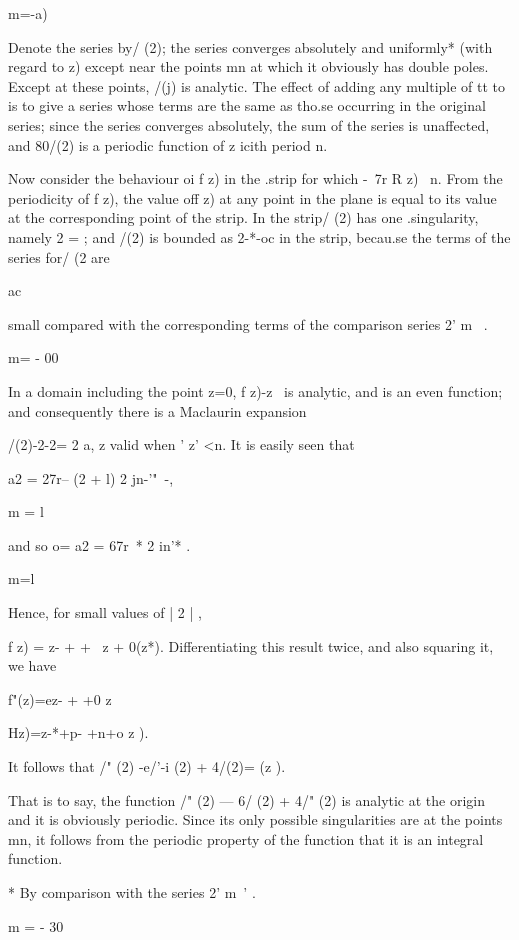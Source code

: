 {m=-a) 

Denote the series by/ (2); the series converges absolutely and uniformly* (with regard 
to z) except near the points mn at which it obviously has double poles. Except at these 
points, /(j) is analytic. The effect of adding any multiple of tt to   is to give a series 
whose terms are the same as tho.se occurring in the original series; since the series 
converges absolutely, the sum of the series is unaffected, and 80/(2) is a periodic function 
of z icith period n. 

Now consider the behaviour oi f z) in the .strip for which -\ 7r  R z) \ n. From 
the periodicity of f z), the value off z) at any point in the plane is equal to its value at 
the corresponding point of the strip. In the strip/ (2) has one .singularity, namely 2 = ; 
and /(2) is bounded as 2-*-oc in the strip, becau.se the terms of the series for/ (2 are 

ac 

small compared with the corresponding terms of the comparison series 2' m~ . 

m= - 00 

In a domain including the point z=0, f z)-z~  is analytic, and is an even function; 
and consequently there is a Maclaurin expansion 

/(2)-2-2= 2 a, z  
valid when ' z' <n. It is easily seen that 

a2  = 27r-- (2  + l) 2 jn-'"~-, 

m = l 

and so  o=   a2 = 67r~* 2 in'* . 

m=l 

Hence, for small values of | 2 | , 

f z) = z-  +   +  \ z  + 0(z*). 
Differentiating this result twice, and also squaring it, we have 

f"(z)=ez- + +0 z%

 Hz)=z-*+p- +n+o z ). 

It follows that /" (2) -e/'-i (2) + 4/(2)= (z ). 

That is to say, the function /" (2) — 6/  (2) + 4/" (2) is analytic at the origin and it is 
obviously periodic. Since its only possible singularities are at the points mn, it follows 
from the periodic property of the function that it is an integral function. 

* By comparison with the series 2' m~' . 

m = - 30 



}
